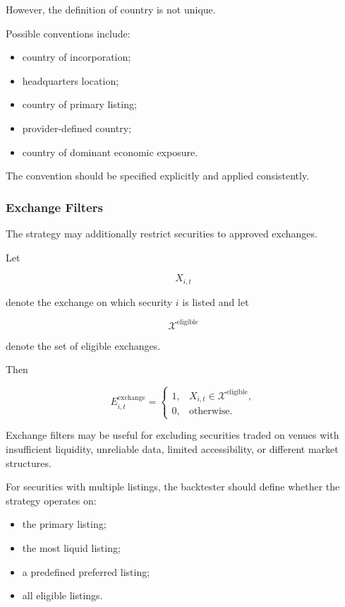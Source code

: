 \documentclass[11pt,a4paper]{article}
\begin{document}
However, the definition of country is not unique.

Possible conventions include:

\begin{itemize}
    \item country of incorporation;
    \item headquarters location;
    \item country of primary listing;
    \item provider-defined country;
    \item country of dominant economic exposure.
\end{itemize}

The convention should be specified explicitly and applied consistently.


\subsubsection{Exchange Filters}

The strategy may additionally restrict securities to approved exchanges.

Let

\begin{equation}
X_{i,t}
\end{equation}

denote the exchange on which security $i$ is listed and let

\begin{equation}
\mathcal{X}^{\mathrm{eligible}}
\end{equation}

denote the set of eligible exchanges.

Then

\begin{equation}
E_{i,t}^{\mathrm{exchange}}
=
\begin{cases}
1,
&
X_{i,t}\in\mathcal{X}^{\mathrm{eligible}},
\\
0,
&
\text{otherwise}.
\end{cases}
\end{equation}

Exchange filters may be useful for excluding securities traded on venues with
insufficient liquidity, unreliable data, limited accessibility, or different
market structures.

For securities with multiple listings, the backtester should define whether the
strategy operates on:

\begin{itemize}
    \item the primary listing;
    \item the most liquid listing;
    \item a predefined preferred listing;
    \item all eligible listings.
\end{itemize}
\end{document}
